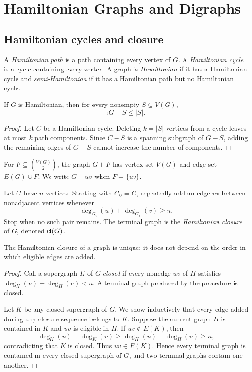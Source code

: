 \chapter{Hamiltonian Graphs and Digraphs}

\section{Hamiltonian cycles and closure}

\begin{notedefinition}
A \emph{Hamiltonian path} is a path containing every vertex of $G$.  A \emph{Hamiltonian cycle} is a cycle containing every vertex.  A graph is \emph{Hamiltonian} if it has a Hamiltonian cycle and \emph{semi-Hamiltonian} if it has a Hamiltonian path but no Hamiltonian cycle.
\end{notedefinition}

\begin{notetheorem}
If $G$ is Hamiltonian, then for every nonempty $S\subseteq V(G)$,
\[
  \comp{G-S}\le |S|.
\]
\end{notetheorem}
\begin{proof}
Let $C$ be a Hamiltonian cycle.  Deleting $k=|S|$ vertices from a cycle leaves at most $k$ path components.  Since $C-S$ is a spanning subgraph of $G-S$, adding the remaining edges of $G-S$ cannot increase the number of components.
\end{proof}

\begin{notedefinition}
For $F\subseteq\binom{V(G)}2$, the graph $G+F$ has vertex set $V(G)$ and edge set $E(G)\cup F$.  We write $G+uv$ when $F=\{uv\}$.
\end{notedefinition}

\begin{notedefinition}
Let $G$ have $n$ vertices.  Starting with $G_0=G$, repeatedly add an edge $uv$ between nonadjacent vertices whenever
\[
  \deg_{G_i}(u)+\deg_{G_i}(v)\ge n.
\]
Stop when no such pair remains.  The terminal graph is the \emph{Hamiltonian closure} of $G$, denoted $\operatorname{cl}(G)$.
\end{notedefinition}
\begin{notetheorem}
The Hamiltonian closure of a graph is unique; it does not depend on the order in which eligible edges are added.
\end{notetheorem}
\begin{proof}
Call a supergraph $H$ of $G$ \emph{closed} if every nonedge $uv$ of $H$ satisfies $\deg_H(u)+\deg_H(v)<n$.  A terminal graph produced by the procedure is closed.

Let $K$ be any closed supergraph of $G$.  We show inductively that every edge added during any closure sequence belongs to $K$.  Suppose the current graph $H$ is contained in $K$ and $uv$ is eligible in $H$.  If $uv\notin E(K)$, then
\[
  \deg_K(u)+\deg_K(v)\ge \deg_H(u)+\deg_H(v)\ge n,
\]
contradicting that $K$ is closed.  Thus $uv\in E(K)$.  Hence every terminal graph is contained in every closed supergraph of $G$, and two terminal graphs contain one another.
\end{proof}


